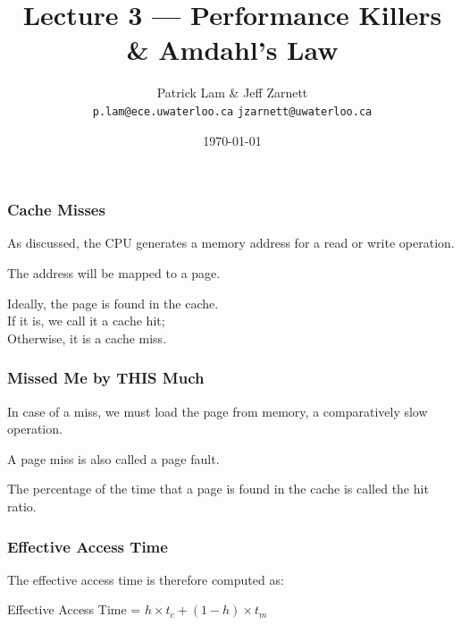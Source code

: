 

\title{Lecture 3 --- Performance Killers \& Amdahl's Law }

\author{Patrick Lam \& Jeff Zarnett \\ \small \texttt{p.lam@ece.uwaterloo.ca} \texttt{jzarnett@uwaterloo.ca}}
\date{\today}




\begin{frame}
  \titlepage

 \end{frame}



\begin{frame}
\frametitle{Cache Misses}

As discussed, the CPU generates a memory address for a read or write operation.

The address will be mapped to a page. 

Ideally, the page is found in the cache.\\
\quad If it is, we call it a \alert{cache hit};\\
\quad Otherwise, it is a \alert{cache miss}.

\end{frame}



\begin{frame}
\frametitle{Missed Me by THIS Much}

In case of a miss, we must load the page from memory, a comparatively slow operation.

A page miss is also called a \alert{page fault}. 
 
The percentage of the time that a page is found in the cache is called the \alert{hit ratio}.

\end{frame}



\begin{frame}
\frametitle{Effective Access Time}

 The effective access time is therefore computed as:

\begin{center}
Effective Access Time = $h \times t_{c} + (1-h) \times t_{m}$
\end{center}

\end{frame}



